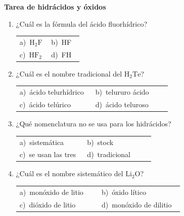 \documentclass[11pt,a4paper]{article}
\begin{document}
{\Large\bfseries Tarea de hidrácidos y óxidos}
\vspace{12pt}
\begin{enumerate}[label=\textbf{\arabic*.},leftmargin=*,itemsep=11pt,topsep=0pt]
\item \begin{minipage}[t]{\linewidth}
¿Cuál es la fórmula del ácido fluorhídrico?

\vspace{5pt}
\begin{tabular}{@{}p{0.47\linewidth}p{0.47\linewidth}@{}}
a)~$\mathrm{H_{2}F}$ & b)~HF \\
c)~$\mathrm{HF_{2}}$ & d)~FH \\
\end{tabular}
\end{minipage}

\item \begin{minipage}[t]{\linewidth}
¿Cuál es el nombre tradicional del $\mathrm{H_{2}Te}$?

\vspace{5pt}
\begin{tabular}{@{}p{0.47\linewidth}p{0.47\linewidth}@{}}
a)~ácido telurhídrico & b)~telururo ácido \\
c)~ácido telúrico & d)~ácido teluroso \\
\end{tabular}
\end{minipage}

\item \begin{minipage}[t]{\linewidth}
¿Qué nomenclatura no se usa para los hidrácidos?

\vspace{5pt}
\begin{tabular}{@{}p{0.47\linewidth}p{0.47\linewidth}@{}}
a)~sistemática & b)~stock \\
c)~se usan las tres & d)~tradicional \\
\end{tabular}
\end{minipage}

\item \begin{minipage}[t]{\linewidth}
¿Cuál es el nombre sistemático del $\mathrm{Li_{2}O}$?

\vspace{5pt}
\begin{tabular}{@{}p{0.47\linewidth}p{0.47\linewidth}@{}}
a)~monóxido de litio & b)~óxido lítico \\
c)~dióxido de litio & d)~monóxido de dilitio \\
\end{tabular}
\end{minipage}


\end{enumerate}
\end{document}
